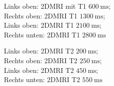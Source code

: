 \begin{figure}[H]
    \centering
    \subfigure{}
    \subfigure{}
    \subfigure{}
    \subfigure{}
    \caption{Links oben: 2DMRI mit T1 $\SI{600}{\milli\second}$;\\ Rechts oben: 2DMRI T1 $\SI{1300}{\milli\second}$;\\
    Links oben: 2DMRI T1 $\SI{2100}{\milli\second}$;\\ Rechts unten: 2DMRI T1 $\SI{2800}{\milli\second}$}
    \label{fig:Energieschema}
\end{figure}
\begin{figure}[H]
    \centering
    \subfigure{}
    \subfigure{}
    \subfigure{}
    \subfigure{}
    \caption{Links oben: 2DMRI T2 $\SI{200}{\milli\second}$;\\ Rechts oben: 2DMRI T2 $\SI{250}{\milli\second}$;\\
    Links oben: 2DMRI T2 $\SI{450}{\milli\second}$;\\ Rechts unten: 2DMRI T2 $\SI{550}{\milli\second}$}
    \label{fig:Energieschema}
\end{figure}